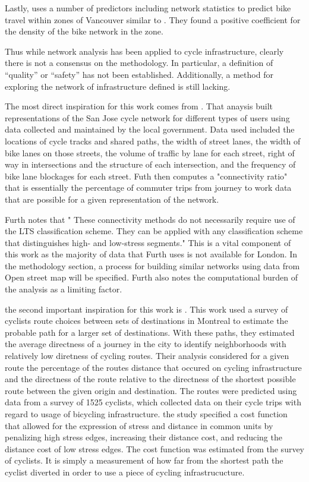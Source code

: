 Lastly, \cite{osama2017models} uses a number of predictors including network statistics to predict bike travel within zones of Vancouver similar to \cite{schoner2014missing}. They found a positive coefficient for the density of the bike network in the zone. 

Thus while network analysis has been applied to cycle infrastructure, clearly there is not a consensus on the methodology. In particular, a definition of ``quality'' or ``safety'' has not been established. Additionally, a method for exploring the network of infrastructure defined is still lacking. 

The most direct inspiration for this work comes from \cite{furth2016network}. That anaysis built representations of the San Jose cycle network for different types of users using data collected and maintained by the local government. Data used included the locations of cycle tracks and shared paths, the width of street lanes, the width of bike lanes on those streets,  the volume of traffic by lane for each street, right of way in intersections and the structure of each intersection, and the frequency of bike lane blockages for each street. Futh then computes a "connectivity ratio" that is essentially the percentage of commuter trips from journey to work data that are possible for a given representation of the network. 

Furth notes that " These connectivity methods do not necessarily require use of the LTS classification scheme. They can be applied with any classification scheme that distinguishes high- and low-stress segments." This is a vital component of this work as the majority of data that Furth uses is not available for London. In the methodology section, a process for building similar networks using data from Open street map will be specified. Furth also notes the computational burden of the analysis as a limiting factor. 

the second important inspiration for this work is \cite{boisjoly2019bicycle}. This work used a survey of cyclists route choices between sets of destinations in Montreal to estimate the probable path for a larger set of destinations. With these paths, they estimated the average directness of a journey in the city to identify neighborhoods with relatively low diretness of cycling routes.  Their analysis considered for a given route the percentage of the routes distance that occured on cycling infrastructure and the directness of the route relative to the directness of the shortest possible route between the given origin and destination. The routes were predicted using data from a survey of 1525 cyclists, which collected data on their cycle trips with regard to usage of bicycling infrastructure. the study specified a cost function that allowed for the expression of stress and distance in common units by penalizing high stress edges, increasing their distance cost, and reducing the distance cost of low stress edges. The cost function was estimated from the survey of cyclists. It is simply a measurement of how far from the shortest path the cyclist diverted in order to use a piece of cycling infrastrucucture. 

